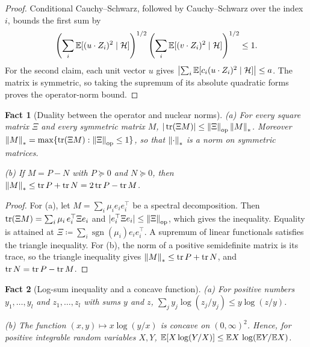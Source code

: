 \documentclass[11pt,letterpaper]{article}
\theoremstyle{plain}
\newtheorem{fact}{Fact}[section]
\begin{document}
\begin{proof}
Conditional Cauchy--Schwarz, followed by Cauchy--Schwarz over the
index \(i\), bounds the first sum by
\[
 \left(\sum_i\mathbb E[(u\cdot Z_i)^2\mid\mathcal H]\right)^{1/2}
 \left(\sum_i\mathbb E[(v\cdot Z_i)^2\mid\mathcal H]\right)^{1/2}\le1.
\]
For the second claim, each unit vector \(u\) gives
\(\bigl|\sum_i\mathbb E[c_i(u\cdot Z_i)^2\mid\mathcal H]\bigr|\le a\).
The matrix is symmetric, so taking the supremum of its absolute
quadratic forms proves the operator-norm bound.
\end{proof}


\begin{fact}[Duality between the operator and nuclear norms]\label{tb:nuclear}
(a) For every square matrix \(\Xi\) and every symmetric matrix \(M\),
\(|\operatorname{tr}(\Xi M)|\le\left\lVert\Xi\right\rVert_{\mathrm{op}}\left\lVert M\right\rVert_*\). Moreover
\(\left\lVert M\right\rVert_*=\max\{\operatorname{tr}(\Xi M):\left\lVert\Xi\right\rVert_{\mathrm{op}}\le1\}\), so that \(\left\lVert\cdot\right\rVert_*\) is
a norm on symmetric matrices.

(b) If \(M=P-N\) with \(P\succeq0\) and \(N\succeq0\), then
\(\left\lVert M\right\rVert_*\le\operatorname{tr} P+\operatorname{tr} N=2\operatorname{tr} P-\operatorname{tr} M\).
\end{fact}

\begin{proof}
For (a), let \(M=\sum_i\mu_ie_ie_i^\top\) be a spectral decomposition. Then
\(\operatorname{tr}(\Xi M)=\sum_i\mu_i\,e_i^\top\Xi e_i\) and \(|e_i^\top\Xi e_i|\le
\left\lVert\Xi\right\rVert_{\mathrm{op}}\), which gives the inequality. Equality is attained at
\(\Xi\coloneqq \sum_i\operatorname{sgn}(\mu_i)e_ie_i^\top\). A supremum of linear
functionals satisfies the triangle inequality. For (b), the norm of a
positive semidefinite matrix is its trace, so the triangle inequality gives
\(\left\lVert M\right\rVert_*\le\operatorname{tr} P+\operatorname{tr} N\), and \(\operatorname{tr} N=\operatorname{tr} P-\operatorname{tr} M\).
\end{proof}


\begin{fact}[Log-sum inequality and a concave function]\label{tb:logsum}
(a) For positive numbers \(y_1,\ldots,y_l\) and \(z_1,\ldots,z_l\) with sums
\(y\) and \(z\),
\(\sum_jy_j\log(z_j/y_j)\le y\log(z/y)\).

(b) The function \((x,y)\mapsto x\log(y/x)\) is concave on \((0,\infty)^2\).
Hence, for positive integrable random variables \(X,Y\),
\(\mathbb E[X\log(Y/X)]\le\mathbb E X\,\log(\mathbb E Y/\mathbb E X)\).
\end{fact}
\end{document}
